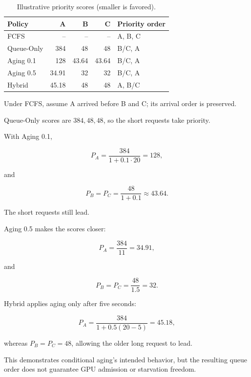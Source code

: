 \documentclass[sigplan,nonacm]{acmart}
\begin{document}
\begin{table}[h]
\centering
\caption{
Illustrative priority scores
(smaller is favored).
}
\label{tab:example}
\scriptsize
\setlength{\tabcolsep}{3pt}
\begin{tabular}{lrrrl}
\toprule
Policy & A & B & C & Priority order\\
\midrule
FCFS & -- & -- & -- & A, B, C\\
Queue-Only & 384 & 48 & 48 & B/C, A\\
Aging 0.1 & 128 & 43.64 & 43.64 & B/C, A\\
Aging 0.5 & 34.91 & 32 & 32 & B/C, A\\
Hybrid & 45.18 & 48 & 48 & A, B/C\\
\bottomrule
\end{tabular}
\end{table}

Under FCFS, assume A arrived before B and C;
its arrival order is preserved.

Queue-Only scores are $384,48,48$,
so the short requests take priority.

With Aging 0.1,

\begin{equation}
P_A=
\frac{384}{1+0.1\cdot20}
=128,
\end{equation}

and

\begin{equation}
P_B=P_C=
\frac{48}{1+0.1}
\approx43.64.
\end{equation}

The short requests still lead.

Aging 0.5 makes the scores closer:

\begin{equation}
P_A=
\frac{384}{11}
=34.91,
\end{equation}

and

\begin{equation}
P_B=P_C=
\frac{48}{1.5}
=32.
\end{equation}

Hybrid applies aging only after five seconds:

\begin{equation}
P_A=
\frac{384}{1+0.5(20-5)}
=45.18,
\end{equation}

whereas $P_B=P_C=48$, allowing the older
long request to lead.

This demonstrates conditional aging's
intended behavior, but the resulting queue
order does not guarantee GPU admission
or starvation freedom.
\end{document}
